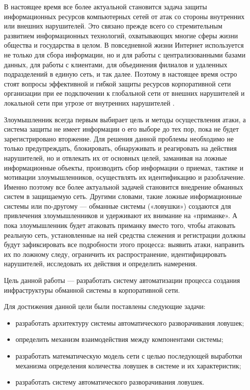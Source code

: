 
В настоящее время все более актуальной становится задача защиты информационных ресурсов компьютерных сетей от атак со стороны внутренних или внешних нарушителей. Это связано прежде всего со стремительным развитием информационных технологий, охватывающих многие сферы жизни общества и государства в целом. В повседневной жизни Интернет используется не только для сбора информации, но и для работы с централизованными базами данных, для работы с клиентами, для объединения филиалов и удаленных подразделений в единую сеть, и так далее. Поэтому в настоящее время остро стоят вопросы  эффективной и гибкой защиты ресурсов корпоративной сети организации при ее подключении к глобальной сети от внешних нарушителей и локальной сети при угрозе от внутренних нарушителей \citep{emelyanova_fralenko}.

Злоумышленник всегда первым выбирает цель и методы осуществления атаки, а система защиты не имеет информации о его выборе до тех пор, пока не будет зарегистрировано вторжение. Для решения данной проблемы необходимо не только предупреждать, блокировать, обнаруживать и реагировать на действия нарушителей, но и отвлекать их от основных целей, заманивая на ложные информационные объекты, производить сбор информации о приемах, тактике и мотивации злоумышленников, осуществлять их идентификацию и разоблачение. Именно поэтому все более актуальной задачей становится внедрение обманных систем в защищаемую сеть. Другими словами, такие ложные информационные системы или по-другому — обманные системы («ловушки») создаются для привлечения злоумышленников и удерживают их внимание на «приманке». А пока злоумышленник будет атаковать приманку вместо того, чтобы атаковать реальную сеть, установленные на ней средства слежения и регистрации должны будут зафиксировать все подробности этого процесса:  выявить атаки, направить их по ложному следу, ограничить их распространение, идентифицировать нарушителей, исследовать их действия и определить намерения.

Цель данной работы — разработать систему автоматизации процесса создания инфраструктуры обманной системы в корпоративной сети.

Для достижения данной цели были поставлены следующие задачи: 

\begin{itemize}
	\item разработать архитектуру системы автоматического разворачивания ловушек;
	\item определить механизм взаимодействия между компонентами системы;
	\item разработать математическую модель сети с целью последующей выработки механизма определения количества ловушек в системе и их характеристик;
	\item разработать систему автоматического разворачивания ловушек.
\end{itemize}